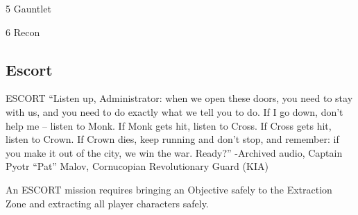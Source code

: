  5                                                      Gauntlet

 6                                                      Recon


\subsection{Escort}


                                                               ESCORT
                                                               “Listen up, Administrator: when we open these
                                                               doors, you need to stay with us, and you need to
                                                               do exactly what we tell you to do. If I go down,
                                                               don’t help me -- listen to Monk. If Monk gets hit,
                                                               listen to Cross. If Cross gets hit, listen to Crown.
                                                               If Crown dies, keep running and don’t stop, and
                                                               remember: if you make it out of the city, we win
                                                               the war. Ready?”
                                                               -Archived audio, Captain Pyotr “Pat” Malov,
                                                               Cornucopian Revolutionary Guard (KIA)

                                                               An ESCORT mission requires bringing an
                                                               Objective safely to the Extraction Zone and
                                                               extracting all player characters safely.

